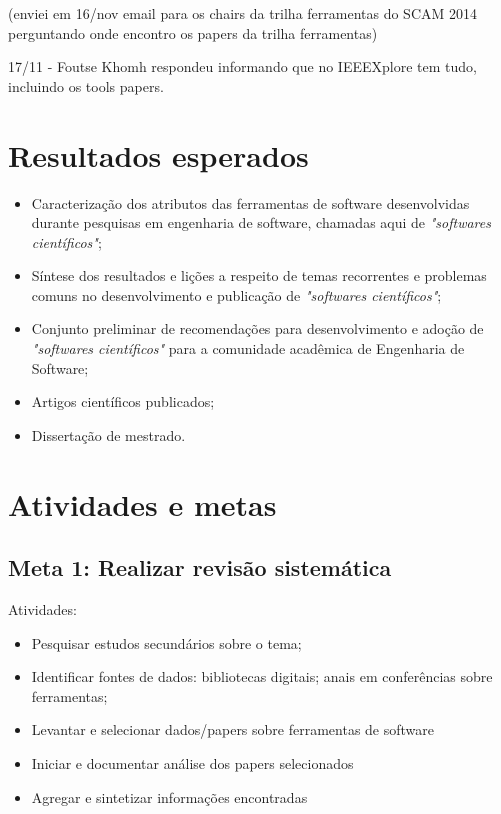 \documentclass[12pt]{article}
\begin{document}
(enviei em 16/nov email para os chairs da trilha ferramentas do SCAM 2014
perguntando onde encontro os papers da trilha ferramentas)

17/11 - Foutse Khomh respondeu informando que no IEEEXplore tem tudo,
incluindo os tools papers.

\section{Resultados esperados}

\begin{itemize}
  \item Caracterização dos atributos das ferramentas de software desenvolvidas
    durante pesquisas em engenharia de software, chamadas aqui de \textit{"softwares científicos"};
  \item Síntese dos resultados e lições a respeito de temas recorrentes e
    problemas comuns no desenvolvimento e publicação de \textit{"softwares
      científicos"};
  \item Conjunto preliminar de recomendações para desenvolvimento e adoção de
    \textit{"softwares científicos"} para a comunidade acadêmica de Engenharia de
    Software;
  \item Artigos científicos publicados;
  \item Dissertação de mestrado.
\end{itemize}

\section{Atividades e metas}

\subsection{Meta 1: Realizar revisão sistemática}

Atividades:

\begin{itemize}
  \item Pesquisar estudos secundários sobre o tema;
  \item Identificar fontes de dados: bibliotecas digitais; anais em
    conferências sobre ferramentas;
  \item Levantar e selecionar dados/papers sobre ferramentas de software
  \item Iniciar e documentar análise dos papers selecionados
  \item Agregar e sintetizar informações encontradas
\end{itemize}
\end{document}
